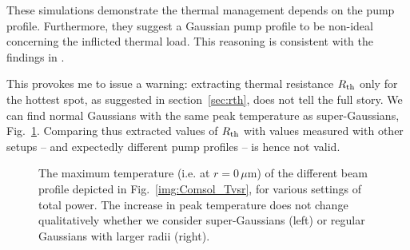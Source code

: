 These simulations demonstrate
the thermal management
depends on the pump profile.
Furthermore, they suggest
a Gaussian pump profile
to be non-ideal
concerning the inflicted thermal load.
This reasoning is consistent
with the findings in \cite{Chernikov2010}.

This provokes
me to issue a warning:
extracting thermal resistance $R_\mathrm{th}$
only for the hottest spot,
as suggested in section~\ref{sec:rth},
does not tell the full story.
We can find normal Gaussians
with the same peak temperature
as super-Gaussians,
Fig.~\ref{img:Comsol_Tmax_BeamProfile}.
Comparing thus extracted values of $R_\mathrm{th}$
with values measured with other setups --
and expectedly different pump profiles --
is hence not valid.

\begin{figure}
\centering
{}
\caption{The maximum temperature (i.e. at $r=0\,\mu\mathrm{m}$)
of the different beam profile depicted in Fig.~\ref{img:Comsol_Tvsr},
for various settings of total power.
The increase in peak temperature
does not change qualitatively
whether we consider super-Gaussians (left)
or regular Gaussians with larger radii (right).}
\label{img:Comsol_Tmax_BeamProfile}
\end{figure}
